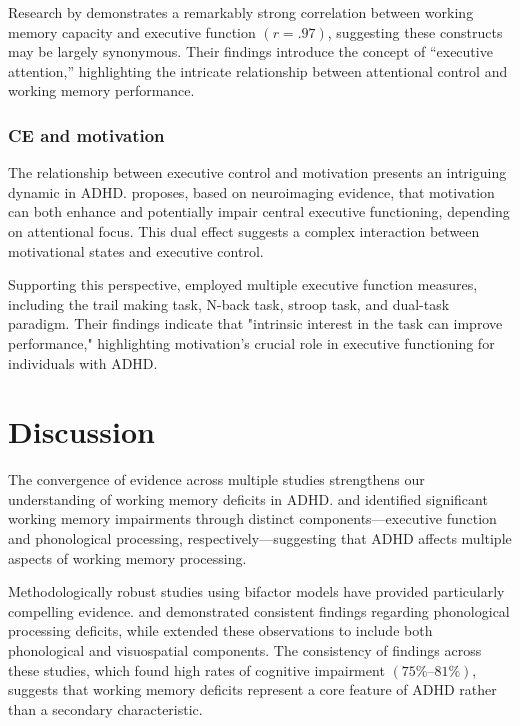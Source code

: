 \documentclass[stu]{apa7}
\begin{document}
Research by \textcite{mccabe_relationship_2010} demonstrates a remarkably strong correlation between working memory capacity and executive function \((r = .97)\), suggesting these constructs may be largely synonymous. Their findings introduce the concept of ``executive attention,'' highlighting the intricate relationship between attentional control and working memory performance.

\subsubsection{CE and motivation}

The relationship between executive control and motivation presents an intriguing dynamic in ADHD. \textcite{pessoa_how_2009} proposes, based on neuroimaging evidence, that motivation can both enhance and potentially impair central executive functioning, depending on attentional focus. This dual effect suggests a complex interaction between motivational states and executive control.

Supporting this perspective, \textcite{elosua_differences_2017} employed multiple executive function measures, including the trail making task, N-back task, stroop task, and dual-task paradigm. Their findings indicate that "intrinsic interest in the task can improve performance," highlighting motivation's crucial role in executive functioning for individuals with ADHD.

\section{Discussion}

The convergence of evidence across multiple studies strengthens our understanding of working memory deficits in ADHD. \textcite{elosua_differences_2017} and \textcite{fried_clinical_2016} identified significant working memory impairments through distinct components—executive function and phonological processing, respectively—suggesting that ADHD affects multiple aspects of working memory processing.

Methodologically robust studies using bifactor models have provided particularly compelling evidence. \textcite{friedman_reading_2017} and \textcite{raiker_phonological_2019} demonstrated consistent findings regarding phonological processing deficits, while \textcite{kofler_working_2020} extended these observations to include both phonological and visuospatial components. The consistency of findings across these studies, which found high rates of cognitive impairment \((75\%\text{--}81\%)\), suggests that working memory deficits represent a core feature of ADHD rather than a secondary characteristic.
\end{document}

